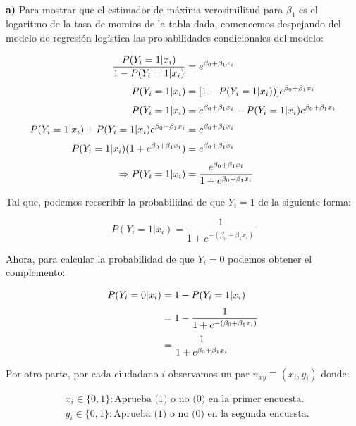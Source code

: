 \noindent{}\\

\textbf{a)} Para mostrar que el estimador de máxima verosimilitud para $\beta_1$ es el logaritmo de la tasa de momios de la tabla dada, comencemos despejando del modelo de regresión logística las probabilidades condicionales del modelo: 

\begin{align}
    \frac{P(Y_i = 1|x_i)}{1 - P(Y_i = 1|x_i)} &= e^{\beta_0 + \beta_1 x_i} \notag \\[0.1cm]
    P(Y_i = 1|x_i) &= [1 - P(Y_i = 1|x_i))] e^{\beta_0 + \beta_1 x_i} \notag \\[0.1cm]
    P(Y_i = 1|x_i) &= e^{\beta_0 + \beta_1 x_i} - P(Y_i = 1|x_i)e^{\beta_0 + \beta_1 x_i} \notag \\[0.1cm]
    P(Y_i = 1|x_i) + P(Y_i = 1|x_i) e^{\beta_0 + \beta_1 x_i} &= e^{\beta_0 + \beta_1 x_i} \notag \\[0.1cm]
    P(Y_i = 1|x_i)(1 + e^{\beta_0 + \beta_1 x_i}) &= e^{\beta_0 + \beta_1 x_i} \notag \\[0.1cm]
    \Rightarrow P(Y_i = 1|x_i) &= \frac{e^{\beta_0 + \beta_1 x_i}}{1 + e^{\beta_0 + \beta_1 x_i}}
    \label{eq:1.1}
\end{align}

Tal que, podemos reescribir la probabilidad de que $Y_i=1$ de la siguiente forma:

\begin{equation}
    P(Y_i = 1|x_i) = \frac{1}{1 + e^{-(\beta_0 + \beta_1 x_i)}}
    \label{eq:1.2}
\end{equation}

\newpage
Ahora, para calcular la probabilidad de que $Y_i=0$ podemos obtener el complemento:

\begin{align}
    P(Y_i = 0|x_i) &= 1 - P(Y_i = 1|x_i) \notag \\[0.1cm] 
    &= 1- \frac{1}{1 + e^{-(\beta_0 + \beta_1 x_i)}} \notag \\[0.1cm] 
    &= \frac{1}{1+e^{\beta_0 + \beta_1 x_i}}
    \label{eq:1.3}
\end{align}

Por otro parte, por cada ciudadano $i$ observamos un par $n_{xy}\equiv (x_i,y_i)$ donde:

\begin{align*}
    & x_i \in \{0,1\}: \text{Aprueba (1) o no (0) en la primer encuesta.} \\[0.1cm]
    & y_i \in \{0,1\}: \text{Aprueba (1) o no (0) en la segunda encuesta.}
\end{align*}

